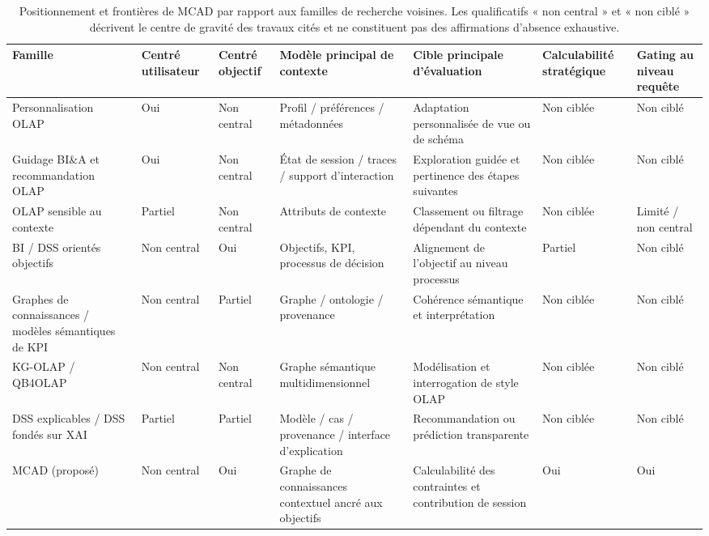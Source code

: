 \documentclass[journal]{IEEEtran}
\begin{document}
\begin{table}[!t]
\centering
\caption{Positionnement et frontières de MCAD par rapport aux familles de recherche voisines. Les qualificatifs « non central » et « non ciblé » décrivent le centre de gravité des travaux cités et ne constituent pas des affirmations d'absence exhaustive.}
\scriptsize
\setlength{\tabcolsep}{3pt}
\begin{tabular}{@{}p{2.65cm}p{1.15cm}p{1.25cm}p{2.15cm}p{2.2cm}p{1.75cm}p{1.55cm}@{}}
\toprule
Famille & Centré utilisateur & Centré objectif & Modèle principal de contexte & Cible principale d'évaluation & Calculabilité stratégique & Gating au niveau requête \\
\midrule
Personnalisation OLAP~\cite{AissiGouider2012,GarrigosER2009,JacobGunklachMaedche2025} & Oui & Non central & Profil / préférences / métadonnées & Adaptation personnalisée de vue ou de schéma & Non ciblée & Non ciblé \\
Guidage BI\&A et recommandation OLAP~\cite{AligonDSS2015,GunklachNadj2023} & Oui & Non central & État de session / traces / support d'interaction & Exploration guidée et pertinence des étapes suivantes & Non ciblée & Non ciblé \\
OLAP sensible au contexte~\cite{RoyContextOLAP2022,AdomaviciusTuzhilin2011} & Partiel & Non central & Attributs de contexte & Classement ou filtrage dépendant du contexte & Non ciblée & Limité / non central \\
BI / DSS orientés objectifs~\cite{Pourshahid2014} & Non central & Oui & Objectifs, KPI, processus de décision & Alignement de l'objectif au niveau processus & Partiel & Non ciblé \\
Graphes de connaissances / modèles sémantiques de KPI~\cite{HoganKGSurvey2021,DiamantiniKPISurvey2025,Niedritis2011,StaudingerSchuetzSchrefl2025} & Non central & Partiel & Graphe / ontologie / provenance & Cohérence sémantique et interprétation & Non ciblée & Non ciblé \\
KG-OLAP / QB4OLAP~\cite{Etcheverry2014,SchuetzSerafiniBozzato2021} & Non central & Non central & Graphe sémantique multidimensionnel & Modélisation et interrogation de style OLAP & Non ciblée & Non ciblé \\
DSS explicables / DSS fondés sur XAI~\cite{KostopoulosXAIDSS2024} & Partiel & Partiel & Modèle / cas / provenance / interface d'explication & Recommandation ou prédiction transparente & Non ciblée & Non ciblé \\
MCAD (proposé) & Non central & Oui & Graphe de connaissances contextuel ancré aux objectifs & Calculabilité des contraintes et contribution de session & Oui & Oui \\
\bottomrule
\end{tabular}
\normalsize
\label{tab:positioning}
\end{table}
\end{document}
